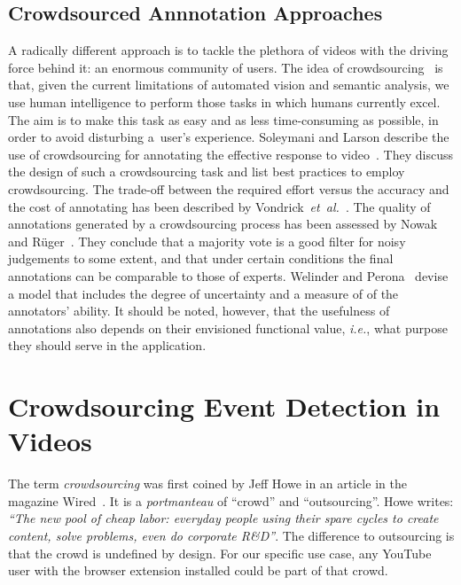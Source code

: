 \documentclass[runningheads,a4paper]{llncs}
\begin{document}
\subsection{Crowdsourced Annnotation Approaches} 
A radically different approach is to tackle the plethora of videos with the driving force behind it: an enormous community of users. The idea of crowdsourcing~\cite{Doan:2011} is that, given the current limitations of automated vision and semantic analysis, we use human intelligence to perform those tasks in which humans currently excel. The aim is to make this task as easy and as less time-consuming as possible, in order to avoid disturbing a~user's experience. Soleymani and Larson describe the use of crowdsourcing for annotating the effective response to video~\cite{Soleymani:2010}. They discuss the design of such a crowdsourcing task and list best practices to employ crowdsourcing. The trade-off between the required effort versus the accuracy and the cost of annotating has been described by Vondrick~\emph{et~al.}~\cite{Vondrick:2010}. The quality of annotations generated by a crowdsourcing process has been assessed by Nowak and R\"{u}ger~\cite{Nowak:2010}. They conclude that a majority vote is a good filter for noisy judgements to some extent, and that under certain conditions the final annotations can be comparable to those of experts. Welinder and Perona~\cite{Welinder:2010} devise a model that includes the degree of uncertainty and a measure of of the annotators' ability. It should be noted, however, that the usefulness of annotations also depends on their envisioned functional value, \emph{i.e.}, what purpose they should serve in the application.

\section{Crowdsourcing Event Detection in Videos} \label{sec:crowdsourcing}
The term \emph{crowdsourcing} was first coined by Jeff Howe in an article in the magazine Wired~\cite{crowdsourcing}. It is a \textit{portmanteau} of ``crowd'' and ``outsourcing''. Howe writes: \textit{``The new pool of cheap labor: everyday people using their spare cycles to create content, solve problems, even do corporate R\&D''}. The difference to outsourcing is that the crowd is undefined by design. For our specific use case, any YouTube user with the browser extension installed could be part of that crowd. 
\end{document}
